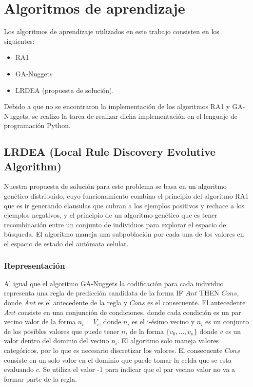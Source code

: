 \section{Algoritmos de aprendizaje}
Los algoritmos de aprendizaje utilizados en este trabajo consisten en los siguientes:
\begin{itemize}
	\item RA1
	\item GA-Nuggets
	\item LRDEA (propuesta de solución).
\end{itemize}

Debido a que no se encontraron la implementación de los algoritmos RA1 y GA-Nuggets, se realizo la tarea de realizar dicha implementación en el lenguaje de programación Python.

\subsection{LRDEA (Local Rule Discovery Evolutive Algorithm)}

Nuestra propuesta de solución para este problema se basa en un algoritmo genético distribuido, cuyo funcionamiento combina el principio del algoritmo RA1 que es ir generando clausulas que cubran a los ejemplos positivos y rechace a los ejemplos negativos, y el principio de un algoritmo genético que es tener recombinación entre un conjunto de individuos para explorar el espacio de búsqueda.  El algoritmo maneja una subpoblación por cada una de los valores en el espacio de estado del autómata celular.

\subsubsection{Representación}

Al igual que el algoritmo GA-Nuggets la codificación para cada individuo representa una regla de predicción candidata de la forma IF $Ant$ THEN $Cons$, donde $Ant$ es el antecedente de la regla y $Cons$ es el consecuente. El antecedente $Ant$ consiste en una conjunción de condiciones, donde cada condición es un par vecino valor de la forma $n_i = V_i$, donde $n_i$ es el i-ésimo vecino y $n_{i}$ es un conjunto de los posibles valores que puede tener $n_i$ de la forma $\{v_{0},\dots,v_{n}\}$ donde $v$ es un valor dentro del dominio del vecino $n_i$. El algoritmo solo maneja valores categóricos, por lo que es necesario discretizar los valores. El consecuente $Cons$ consiste en un solo valor en el dominio que puede tomar la celda que se esta evaluando $c$. Se utiliza el valor -1 para indicar que el par vecino valor no va a formar parte de la regla.


